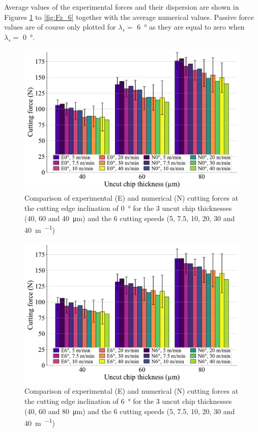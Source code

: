 \documentclass[preprint,12pt,times]{elsarticle}
\begin{document}
Average values of the experimental forces and their dispersion are shown in Figures \ref{fig:Fx_0} to \ref{fig:Fz_6} together with the average numerical values. Passive force values are of course only plotted for $\lambda_s =$ \qty{6}{\degree} as they are equal to zero when $\lambda_s =$ \qty{0}{\degree}.

\begin{figure}[!h]
\centering
\includegraphics[width = 140 mm]{Figures/Fx_0}
\caption{Comparison of experimental (E) and numerical (N) cutting forces at the cutting edge inclination of \qty{0}{\degree} for the 3 uncut chip thicknesses (40, 60 and \qty{40}{\um}) and the 6 cutting speeds (5, 7.5, 10, 20, 30 and \qty{40}{\m\per\min})}
\label{fig:Fx_0}
\end{figure}

\begin{figure}[!h]
\centering
\includegraphics[width = 140 mm]{Figures/Fx_6}
\caption{Comparison of experimental (E) and numerical (N) cutting forces at the cutting edge inclination of \qty{6}{\degree} for the 3 uncut chip thicknesses (40, 60 and \qty{80}{\um}) and the 6 cutting speeds (5, 7.5, 10, 20, 30 and \qty{40}{\m\per\min})}
\label{fig:Fx_6}
\end{figure}
\end{document}

